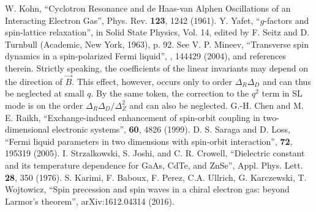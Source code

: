 \documentclass[prb,aps,twocolumn]{revtex4}
\newcommand{\bB}{{\vec B}}
\begin{document}
\begin{thebibliography}{10}
 W. Kohn, ``Cyclotron Resonance and de Haas-van Alphen Oscillations of an Interacting Electron Gas'', Phys. Rev. \textbf{123}, 1242 (1961).
 Y. Yafet, ``$g$-factors and spin-lattice relaxation'', in Solid State Physics, Vol. 14, edited by F. Seitz and D. Turnbull (Academic, New York, 1963), p. 92.
 See V. P. Mineev, ``Transverse spin dynamics in a spin-polarized Fermi liquid'', , 144429 (2004), and references therein.
 Strictly speaking, the coefficients of the linear invariants may depend on the direction of $\bB$. This effect, however, occurs only to order $\Delta_R\Delta_D$ and can thus be neglected at small $q$. By the same token, the correction to the $q^2$ term in SL mode is on the order $\Delta_R\Delta_D/\Delta_Z^2$ and can also be neglected.
 G.-H. Chen and M. E. Raikh, ``Exchange-induced enhancement of spin-orbit coupling in two-dimensional electronic systems'', \prb \textbf{60}, 4826 (1999).
D. S. Saraga and D. Loss, ``Fermi liquid parameters in two dimensions with spin-orbit interaction'', \prb\textbf{72}, 195319 (2005).
 I. Strzalkowski, S. Joshi, and C. R. Crowell, ``Dielectric constant and its temperature dependence for GaAs, CdTe, and ZnSe'', Appl. Phys. Lett. \textbf{28}, 350
(1976).
 S. Karimi, F. Baboux, F. Perez, C.A. Ullrich, G. Karczewski, T. Wojtowicz, ``Spin precession and spin waves in a chiral electron gas: beyond Larmor's theorem'', arXiv:1612.04314 (2016).
\end{thebibliography}
\end{document}
